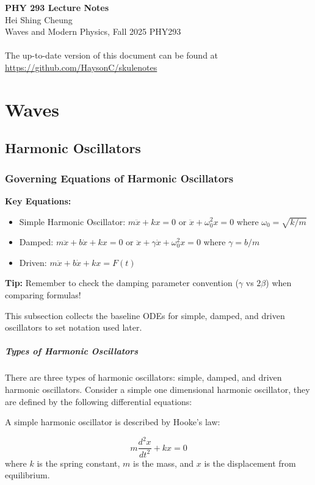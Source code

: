 \documentclass[11pt]{report}
\begin{document}
\thispagestyle{empty}
{\LARGE \bf PHY 293 Lecture Notes}\\
{\large Hei Shing Cheung}\\
Waves and Modern Physics, Fall 2025 \hfill PHY293\\
\\
The up-to-date version of this document can be found at \url{https://github.com/HaysonC/skulenotes}\\

\chapter{Waves}
\section{Harmonic Oscillators}

\subsection{Governing Equations of Harmonic Oscillators}

\begin{keybox}
\textbf{Key Equations:}
\begin{itemize}
    \item Simple Harmonic Oscillator: $m\ddot{x} + kx = 0$ or $\ddot{x} + \omega_0^2 x = 0$ where $\omega_0 = \sqrt{k/m}$
    \item Damped: $m\ddot{x} + b\dot{x} + kx = 0$ or $\ddot{x} + \gamma\dot{x} + \omega_0^2 x = 0$ where $\gamma = b/m$
    \item Driven: $m\ddot{x} + b\dot{x} + kx = F(t)$
\end{itemize}
\textbf{Tip:} Remember to check the damping parameter convention ($\gamma$ vs $2\beta$) when comparing formulas!
\end{keybox}

This subsection collects the baseline ODEs for simple, damped, and driven oscillators to set notation used later.

\paragraph{Types of Harmonic Oscillators} There are three types of harmonic oscillators: simple, damped, and driven harmonic oscillators. Consider a simple one dimensional harmonic oscillator, they are defined by the following differential equations:

\begin{definition}
    A simple harmonic oscillator is described by Hooke's law:

    \begin{equation} \label{eq:hooke}
        m \frac{d^2 x}{dt^2} + kx = 0
    \end{equation}
    where \( k \) is the spring constant, \( m \) is the mass, and \( x \) is the displacement from equilibrium.
\end{definition}
\end{document}
